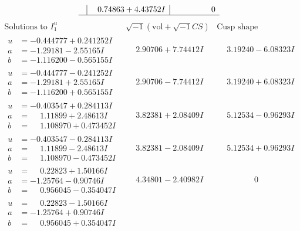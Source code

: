 \documentclass[1p]{elsarticle_modified}
\theoremstyle{definition}
\newcommand{\I}{\sqrt{-1}}
\begin{document}
$$\begin{array}{c|c|c}
 & \phantom{-}0.74863 + 4.43752 I & \phantom{-0.000000 } 0\\
 \hline 
 \end{array}$$\newpage$$\begin{array}{c|c|c}  
\text{Solutions to }I^u_{1}& \I (\text{vol} + \sqrt{-1}CS) & \text{Cusp shape}\\
 \hline 
\begin{aligned}
u &= -0.444777 + 0.241252 I \\
a &= -1.29181 - 2.55165 I \\
b &= -1.116200 - 0.565155 I\end{aligned}
 & \phantom{-}2.90706 + 7.74412 I & \phantom{-}3.19240 - 6.08323 I \\ \hline\begin{aligned}
u &= -0.444777 - 0.241252 I \\
a &= -1.29181 + 2.55165 I \\
b &= -1.116200 + 0.565155 I\end{aligned}
 & \phantom{-}2.90706 - 7.74412 I & \phantom{-}3.19240 + 6.08323 I \\ \hline\begin{aligned}
u &= -0.403547 + 0.284113 I \\
a &= \phantom{-}1.11899 + 2.48613 I \\
b &= \phantom{-}1.108970 + 0.473452 I\end{aligned}
 & \phantom{-}3.82381 + 2.08409 I & \phantom{-}5.12534 - 0.96293 I \\ \hline\begin{aligned}
u &= -0.403547 - 0.284113 I \\
a &= \phantom{-}1.11899 - 2.48613 I \\
b &= \phantom{-}1.108970 - 0.473452 I\end{aligned}
 & \phantom{-}3.82381 - 2.08409 I & \phantom{-}5.12534 + 0.96293 I \\ \hline\begin{aligned}
u &= \phantom{-}0.22823 + 1.50166 I \\
a &= -1.25764 - 0.90746 I \\
b &= \phantom{-}0.956045 - 0.354047 I\end{aligned}
 & \phantom{-}4.34801 - 2.40982 I & \phantom{-0.000000 } 0 \\ \hline\begin{aligned}
u &= \phantom{-}0.22823 - 1.50166 I \\
a &= -1.25764 + 0.90746 I \\
b &= \phantom{-}0.956045 + 0.354047 I\end{aligned}

\end{array}$$
\end{document}
